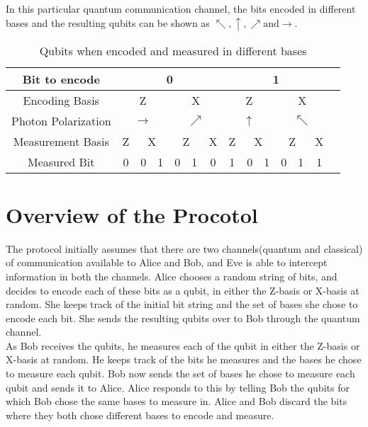 \documentclass[a4paper]{article}
\begin{document}
In this particular quantum communication channel, the bits encoded in different bases and the resulting qubits can be shown as $\nwarrow, \uparrow, \nearrow \text{and} \rightarrow$. 

\begin{table}[h]
    \centering
    \begin{tabular}{| c | c | c | c | c | c | c | c | c | c | c | c | c | c | c | c | c | c |}
    \hline
     Bit to encode & \multicolumn{8}{c|}{0} & \multicolumn{8}{c|}{1} \\
     \hline
     Encoding Basis & \multicolumn{4}{c|}{Z} & \multicolumn{4}{c|}{X} & \multicolumn{4}{c|}{Z} & \multicolumn{4}{c|}{X} \\
     \hline
     Photon Polarization & \multicolumn{4}{c|}{$\rightarrow$} & \multicolumn{4}{c|}{$\nearrow$} & \multicolumn{4}{c|}{$\uparrow$} & \multicolumn{4}{c|}{$\nwarrow$} \\
     \hline
     Measurement Basis & \multicolumn{2}{c|}{Z} & \multicolumn{2}{c|}{X} & \multicolumn{2}{c|}{Z} & \multicolumn{2}{c|}{X} & \multicolumn{2}{c|}{Z} & \multicolumn{2}{c|}{X} & \multicolumn{2}{c|}{Z} & \multicolumn{2}{c|}{X} \\
     \hline
     Measured Bit & \multicolumn{2}{c|}{0} & 0 & 1 & 0 & 1 & \multicolumn{2}{c|}{0} & \multicolumn{2}{c|}{1} & 0 & 1 & 0 & 1 & \multicolumn{2}{c|}{1} \\
     \hline
     
     
     \hline
    \end{tabular}
    \caption{Qubits when encoded and measured in different bases}
    \label{tab:qubit measurements}
\end{table}

\section{Overview of the Procotol} %

The protocol initially assumes that there are two channels(quantum and classical) of communication available to Alice and Bob, and Eve is able to intercept information in both the channels. Alice chooses a random string of bits, and decides to encode each of these bits as a qubit, in either the Z-basis or X-basis at random. She keeps track of the initial bit string and the set of bases she chose to encode each bit. She sends the resulting qubits over to Bob through the quantum channel. \\

As Bob receives the qubits, he measures each of the qubit in either the Z-basis or X-basis at random. He keeps track of the bits he measures and the bases he chose to measure each qubit. Bob now sends the set of bases he chose to measure each qubit and sends it to Alice. Alice responds to this by telling Bob the qubits for which Bob chose the same bases to measure in. Alice and Bob discard the bits where they both chose different bases to encode and measure. \\
\end{document}
